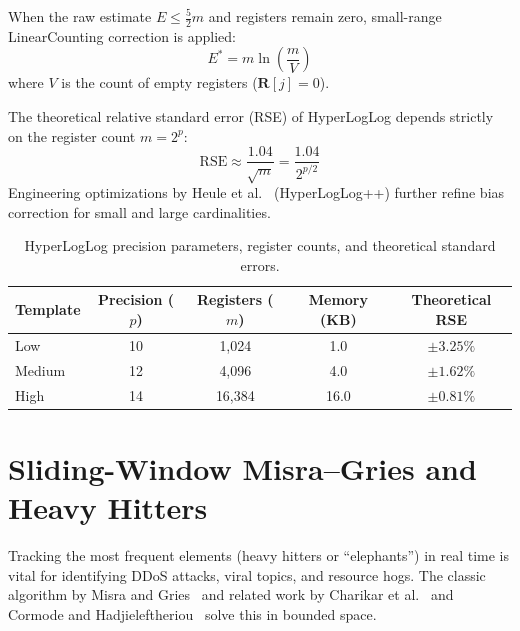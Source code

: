 When the raw estimate $E \le \frac{5}{2}m$ and registers remain zero, small-range LinearCounting correction is applied:
\begin{equation}
    E^* = m \ln \left( \frac{m}{V} \right)
\end{equation}
where $V$ is the count of empty registers ($\mathbf{R}[j] = 0$).

The theoretical relative standard error (RSE) of HyperLogLog depends strictly on the register count $m = 2^p$:
\begin{equation}
    \text{RSE} \approx \frac{1.04}{\sqrt{m}} = \frac{1.04}{2^{p/2}}
\end{equation}
Engineering optimizations by Heule et al.~\cite{heule2013hyperloglog} (HyperLogLog++) further refine bias correction for small and large cardinalities.

\begin{table}[htbp]
\centering
\begin{tabular}{l c c c c}
\toprule
\textbf{Template} & \textbf{Precision ($p$)} & \textbf{Registers ($m$)} & \textbf{Memory (KB)} & \textbf{Theoretical RSE} \\
\midrule
Low    & 10 & 1,024  & 1.0  & $\pm 3.25\%$ \\
Medium & 12 & 4,096  & 4.0  & $\pm 1.62\%$ \\
High   & 14 & 16,384 & 16.0 & $\pm 0.81\%$ \\
\bottomrule
\end{tabular}
\caption{HyperLogLog precision parameters, register counts, and theoretical standard errors.}
\label{tab:hll_templates_ch2}
\end{table}

\section{Sliding-Window Misra--Gries and Heavy Hitters}

Tracking the most frequent elements (heavy hitters or ``elephants'') in real time is vital for identifying DDoS attacks, viral topics, and resource hogs. The classic algorithm by Misra and Gries~\cite{misra} and related work by Charikar et al.~\cite{charikar2002frequent} and Cormode and Hadjieleftheriou~\cite{cormode2008finding} solve this in bounded space.

